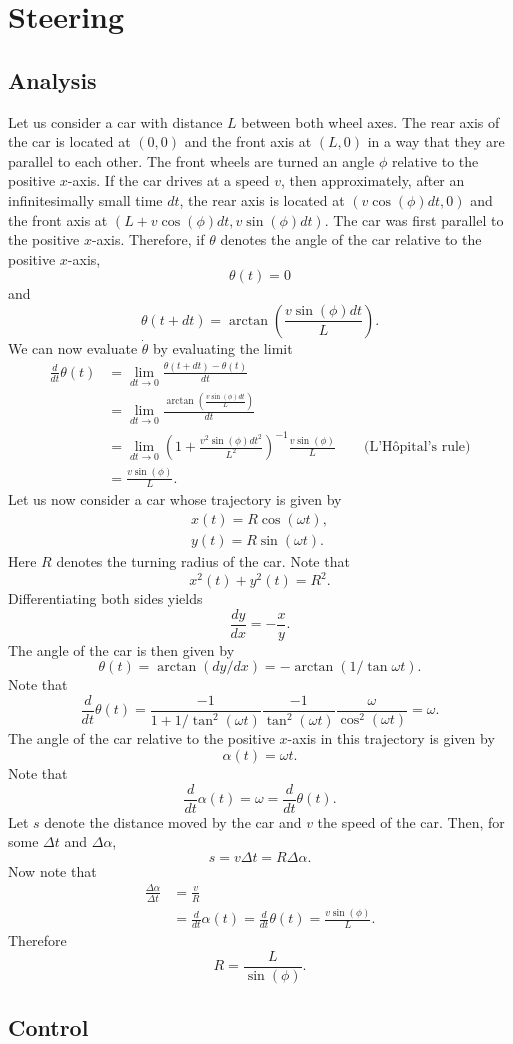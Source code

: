 \documentclass[11pt,titlepage]{report}
\begin{document}
\newcommand{\mat}[1]{\mathbf{#1}}

\chapter*{Steering}
\section*{Analysis}
Let us consider a car with distance $L$ between both wheel axes. The rear axis of the car is located at $(0,0)$ and the front axis at $(L,0)$ in a way that they are parallel to each other. The front wheels are turned an angle $\phi$ relative to the positive $x$-axis. If the car drives at a speed $v$, then approximately, after an infinitesimally small time $dt$, the rear axis is located at $(v \cos{(\phi)}dt,0)$ and the front axis at $(L+v \cos{(\phi)}dt,v \sin{(\phi)}dt)$. The car was first parallel to the positive $x$-axis. Therefore, if $\theta$ denotes the angle of the car relative to the positive $x$-axis,
\[
	\theta(t) = 0
\]
and
\[
	\theta(t+dt)=\arctan{\left(\frac{v \sin{(\phi)}dt}{L}\right)}.
\]
We can now evaluate $\dot{\theta}$ by evaluating the limit
\begin{align}
	\frac{d}{dt}\theta(t) &= \lim_{dt \rightarrow 0} \frac{\theta(t+dt)-\theta(t)}{dt} \nonumber \\
	&= \lim_{dt \rightarrow 0} \frac{\arctan{\left(\frac{v \sin{(\phi)}dt}{L}\right)}}{dt} \nonumber \\
	&= \lim_{dt \rightarrow 0} \left(1+\frac{v^2 \sin{(\phi)}dt^2}{L^2}\right)^{-1}\frac{v \sin{(\phi)}}{L} \quad \quad \text{(L'H\^opital's rule)} \nonumber \\
	&= \frac{v \sin{(\phi)}}{L}.
\end{align}
Let us now consider a car whose trajectory is given by
\begin{align*}
	x(t) = R \cos{(\omega t)}, \\
	y(t) = R \sin{(\omega t)}.
\end{align*}
Here $R$ denotes the turning radius of the car. Note that
\[
	x^2(t)+y^2(t)=R^2.
\]
Differentiating both sides yields
\[
	\frac{dy}{dx}=-\frac{x}{y}.
\]
The angle of the car is then given by
\[
	\theta(t) = \arctan{(dy/dx)} = -\arctan{(1/\tan{\omega t})}.
\]
Note that
\[
	\frac{d}{dt} \theta(t) = \frac{-1}{1+1/\tan^2{(\omega t)}} \frac{-1}{\tan^2{(\omega t)}} \frac{\omega}{\cos^2{(\omega t)}} = \omega.
\]
The angle of the car relative to the positive $x$-axis in this trajectory is given by
\[
	\alpha(t) = \omega t.
\]
Note that
\[
	\frac{d}{dt} \alpha(t) = \omega = \frac{d}{dt} \theta(t).
\]
Let $s$ denote the distance moved by the car and $v$ the speed of the car. Then, for some $\Delta t$ and $\Delta \alpha$,
\[
	s = v \Delta t = R \Delta \alpha.
\]
Now note that
\begin{align*}
	\frac{\Delta \alpha}{\Delta t} &= \frac{v}{R} \\
	&=\frac{d}{dt} \alpha(t)=\frac{d}{dt} \theta(t) = \frac{v \sin{(\phi)}}{L}.
\end{align*}
Therefore
\begin{equation}
	R = \frac{L}{\sin{(\phi)}}.
\end{equation}

\section*{Control}
\end{document}
